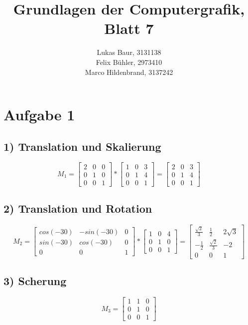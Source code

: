 \documentclass[12pt,pdftex,a4paper]{article}
\begin{document}
\title{ Grundlagen der Computergrafik,\\ Blatt 7}
\author{Lukas Baur, 3131138\\
		Felix Bühler, 2973410\\
		Marco Hildenbrand, 3137242}
\maketitle
\section*{Aufgabe 1}
\subsection*{1) Translation und Skalierung}
\[
M_1=
\begin{bmatrix}
2 & 0 & 0\\
0 & 1 & 0\\
0 & 0 & 1
\end{bmatrix}
*
\begin{bmatrix}
1 & 0 & 3\\
0 & 1 & 4\\
0 & 0 & 1
\end{bmatrix}
=
\begin{bmatrix}
2 & 0 & 3\\
0 & 1 & 4\\
0 & 0 & 1
\end{bmatrix}
\]

\subsection*{2) Translation und Rotation}
\[
M_2=
\begin{bmatrix}
cos(-30) & -sin(-30) & 0\\
sin(-30) & cos(-30) & 0\\
0 & 0 & 1
\end{bmatrix}
*
\begin{bmatrix}
1 & 0 & 4\\
0 & 1 & 0\\
0 & 0 & 1
\end{bmatrix}
=
\begin{bmatrix}
\frac{\sqrt{2}}{3} & \frac{1}{2} & 2\sqrt{3}\\
-\frac{1}{2} & \frac{\sqrt{2}}{3} & -2\\
0 & 0 & 1
\end{bmatrix}
\]

\subsection*{3) Scherung}
\[
M_3=
\begin{bmatrix}
1 & 1 & 0\\
0 & 1 & 0\\
0 & 0 & 1
\end{bmatrix}
\]
\end{document}
